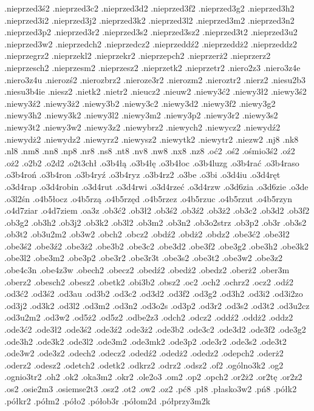 {.nieprzed3ś2
.nieprzed3c2
.nieprzed3d2
.nieprzed3f2
.nieprzed3g2
.nieprzed3h2
.nieprzed3i2
.nieprzed3j2
.nieprzed3k2
.nieprzed3l2
.nieprzed3m2
.nieprzed3n2
.nieprzed3p2
.nieprzed3r2
.nieprzed3s2
.nieprzed3sz2
.nieprzed3t2
.nieprzed3u2
.nieprzed3w2
.nieprzedch2
.nieprzedcz2
.nieprzeddź2
.nieprzeddż2
.nieprzeddz2
.nieprzegrz2
.nieprzekl2
.nieprzekr2
.nieprzepch2
.nieprzerż2
.nieprzerz2
.nieprzesch2
.nieprzesm2
.nieprzesz2
.nieprzetk2
.nieprzetr2
.niero2z3
.niero3z4e
.niero3z4u
.nierozś2
.nierozbrz2
.nieroze3r2
.nierozm2
.nieroztr2
.nierz2
.niesu2b3
.niesu3b4ie
.niesz2
.nietk2
.nietr2
.nieucz2
.nieuw2
.niewy3ć2
.niewy3ł2
.niewy3ś2
.niewy3ź2
.niewy3ż2
.niewy3b2
.niewy3c2
.niewy3d2
.niewy3f2
.niewy3g2
.niewy3h2
.niewy3k2
.niewy3l2
.niewy3m2
.niewy3p2
.niewy3r2
.niewy3s2
.niewy3t2
.niewy3w2
.niewy3z2
.niewybrz2
.niewych2
.niewycz2
.niewydź2
.niewydż2
.niewydz2
.niewyrz2
.niewysz2
.niewytk2
.niewytr2
.niezw2
.nj8
.nk8
.nl8
.nm8
.nn8
.np8
.nr8
.ns8
.nt8
.nv8
.nw8
.nx8
.nz8
.oć2
.oś2
.ośmio3ś2
.oź2
.oż2
.o2b2
.o2d2
.o2t3chł
.o3b4łą
.o3b4łę
.o3b4łoc
.o3b4luzg
.o3b4rać
.o3b4raso
.o3b4roń
.o3b4ron
.o3b4ryź
.o3b4ryz
.o3b4rz2
.o3be
.o3bi
.o3d4iu
.o3d4ręt
.o3d4rap
.o3d4robin
.o3d4rut
.o3d4rwi
.o3d4rzeć
.o3d4rzw
.o3d6zia
.o3d6zie
.o3de
.o3l2śn
.o4b5łocz
.o4b5rzą
.o4b5rzęd
.o4b5rzez
.o4b5rzuc
.o4b5rzut
.o4b5rzyn
.o4d7ziar
.o4d7ziem
.oa3z
.ob3ć2
.ob3ł2
.ob3ś2
.ob3ź2
.ob3ż2
.ob3c2
.ob3d2
.ob3f2
.ob3g2
.ob3h2
.ob3j2
.ob3k2
.ob3l2
.ob3m2
.ob3n2
.ob3o2strz
.ob3p2
.ob3r
.ob3s2
.ob3t2
.ob3u2m2
.ob3w2
.obch2
.obcz2
.obdź2
.obdż2
.obdz2
.obe3ć2
.obe3ł2
.obe3ś2
.obe3ź2
.obe3ż2
.obe3b2
.obe3c2
.obe3d2
.obe3f2
.obe3g2
.obe3h2
.obe3k2
.obe3l2
.obe3m2
.obe3p2
.obe3r2
.obe3r3t
.obe3s2
.obe3t2
.obe3w2
.obe3z2
.obe4c3n
.obe4z3w
.obech2
.obecz2
.obedź2
.obedż2
.obedz2
.oberż2
.ober3m
.oberz2
.obesch2
.obesz2
.obetk2
.obi3b2
.obsz2
.oc2
.och2
.ochrz2
.ocz2
.odź2
.od3ć2
.od3ś2
.od3au
.od3b2
.od3c2
.od3d2
.od3f2
.od3g2
.od3h2
.od3i2
.od3i2zo
.od3j2
.od3k2
.od3l2
.od3m2
.od3n2
.od3o2s
.od3p2
.od3r2
.od3s2
.od3t2
.od3u2cz
.od3u2m2
.od3w2
.od5ż2
.od5z2
.odbe2z3
.odch2
.odcz2
.oddź2
.oddż2
.oddz2
.ode3ć2
.ode3ł2
.ode3ś2
.ode3ź2
.ode3ż2
.ode3b2
.ode3c2
.ode3d2
.ode3f2
.ode3g2
.ode3h2
.ode3k2
.ode3l2
.ode3m2
.ode3mk2
.ode3p2
.ode3r2
.ode3s2
.ode3t2
.ode3w2
.ode3z2
.odech2
.odecz2
.odedź2
.odedż2
.odedz2
.odepch2
.oderż2
.oderz2
.odesz2
.odetch2
.odetk2
.odkrz2
.odrz2
.odsz2
.of2
.ogólno3k2
.og2
.ognio3tr2
.oh2
.ok2
.oka3m2
.okr2
.ole2o3
.om2
.op2
.opch2
.or2ż2
.or2tę
.or2z2
.os2
.osie2m3
.osiemse2t3
.osz2
.ot2
.ow2
.oz2
.pć8
.pł8
.płasko3w2
.pń8
.półk2
.półkr2
.półm2
.póło2
.półob3r
.półom2d
.półprzy3m2k
}
